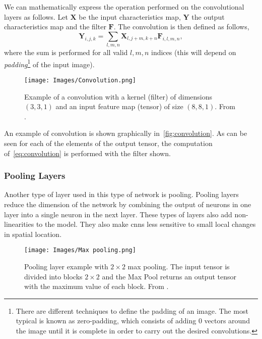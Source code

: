 We can mathematically express the operation performed on the convolutional
layers as follows. Let \(\mathbf{X}\) be the input characteristics map,
\(\mathbf{Y}\) the output characteristics map and the filter
\(\mathbf{F}\). The convolution is then defined as follows,
\begin{equation} \label{eq:convolution}
  \mathbf{Y}_{i, j, k} =
  \sum_{l, m, n} \mathbf{X}_{l, j + m, k + n}\mathbf{F}_{i, l, m, n},
\end{equation}
where the sum is performed for all valid \(l, m, n\) indices (this will depend
on \emph{padding}\footnote{There are different techniques to define the
  padding of an image. The most typical is known as zero-padding, which
  consists of adding 0 vectors around the image until it is complete in order
  to carry out the desired convolutions.} of the input image).

\begin{figure}[ht]
  \centering
  \texttt{[image: Images/Convolution.png]}
  \caption[Example of convolution operation]{Example of a convolution with a
    kernel (filter) of dimensions \((3, 3, 1)\) and an input feature map
    (tensor) of size \((8, 8, 1)\). From
    .}%
  \label{fig:convolution}
\end{figure}

An example of convolution is shown graphically in\ \vref{fig:convolution}. As
can be seen for each of the elements of the output tensor, the computation of\
\vref{eq:convolution} is performed with the filter shown.

\subsubsection{Pooling Layers}
Another type of layer used in this type of network is pooling. Pooling layers
reduce the dimension of the network by combining the output of neurons in one
layer into a single neuron in the next layer. These types of layers also add
non-linearities to the model. They also make \glspl{cnn} less sensitive to
small local changes in spatial location.

\begin{figure}[ht]
  \centering
  \texttt{[image: Images/Max pooling.png]}
  \caption[Pooling layer example with max pooling]{Pooling layer example with
    \(2 \times 2\) max pooling. The input tensor is divided into blocks
    \(2 \times 2\) and the Max Pool returns an output tensor with the maximum
    value of each block. From \figcite{wiki18:max_poolin}.}%
  \label{fig:max-pool}
\end{figure}

